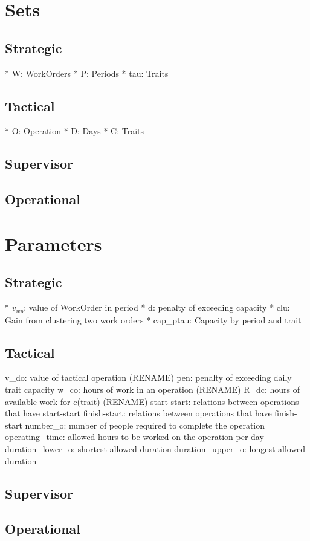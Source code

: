 
\section{Sets}
\subsection{Strategic}
* W: WorkOrders
* P: Periods
* tau: Traits

\subsection{Tactical}
* O: Operation
* D: Days
* C: Traits
\subsection{Supervisor}
\subsection{Operational}

\section{Parameters}
\subsection{Strategic}
* $v_{wp}$: value of WorkOrder in period
* d: penalty of exceeding capacity
* clu: Gain from clustering two work orders
* cap_{ptau}: Capacity by period and trait

\subsection{Tactical}
v_{do}: value of tactical operation (RENAME)
pen: penalty of exceeding daily trait capacity
w_{co}: hours of work in an operation (RENAME)
R_{dc}: hours of available work for c(trait) (RENAME)
start-start: relations between operations that have start-start
finish-start: relations between operations that have finish-start
number_o: number of people required to complete the operation
operating_time: allowed hours to be worked on the operation per day
duration_lower_o: shortest allowed duration
duration_upper_o: longest allowed duration

\subsection{Supervisor}
\subsection{Operational}

